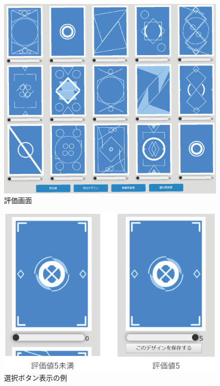 

\begin{figure}[b!]
    \begin{center}
        \centering
        \includegraphics[scale=0.6]{image/value.eps}
        \caption{評価画面}
        \label{value}
    \end{center}
\end{figure}

\begin{figure}[htbp]
    \begin{center}
        \centering
        \includegraphics[scale=0.5]{image/value_5.eps}
        \caption{選択ボタン表示の例}
        \label{elite}
    \end{center}
\end{figure}


